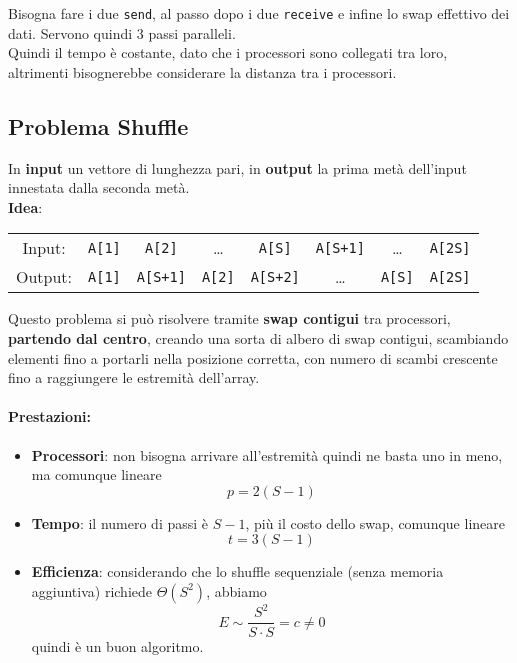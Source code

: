 Bisogna fare i due \texttt{send}, al passo dopo i due \texttt{receive} e infine lo swap effettivo dei dati. Servono quindi 3 passi paralleli.\\

Quindi il tempo è costante, dato che i processori sono collegati tra loro, altrimenti bisognerebbe considerare la distanza tra i processori.\\

\newpage

\subsection{Problema Shuffle}

In \textbf{input} un vettore di lunghezza pari, in \textbf{output} la prima metà dell'input innestata dalla seconda metà.\\

\textbf{Idea}: 
\begin{center}
	\begin{tabular}{c c c c c c c c}
		Input: & \texttt{A[1]} & \texttt{A[2]} & \dots & \texttt{A[S]} & \texttt{A[S+1]} & \dots & \texttt{A[2S]} \\
		Output: & \texttt{A[1]} & \texttt{A[S+1]} & \texttt{A[2]} & \texttt{A[S+2]} & \dots & \texttt{A[S]} & \texttt{A[2S]} \\
	\end{tabular}
\end{center}

Questo problema si può risolvere tramite \textbf{swap contigui} tra processori, \textbf{partendo dal centro}, creando una sorta di albero di swap contigui, scambiando elementi fino a portarli nella posizione corretta, con numero di scambi crescente fino a raggiungere le estremità dell'array.\\

\paragraph{Prestazioni:}
\begin{itemize}
	\item \textbf{Processori}: non bisogna arrivare all'estremità quindi ne basta uno in meno, ma comunque lineare
	$$ p = 2(S-1)$$
	
	\item \textbf{Tempo}: il numero di passi è $S-1$, più il costo dello swap, comunque lineare
	$$ t = 3(S-1) $$
	
	\item \textbf{Efficienza}: considerando che lo shuffle sequenziale (senza memoria aggiuntiva) richiede $\Theta (S^2)$, abbiamo
	$$ E \sim \frac{S^2}{S \cdot S} = c \neq 0 $$ 
	quindi è un buon algoritmo.\\
\end{itemize}

